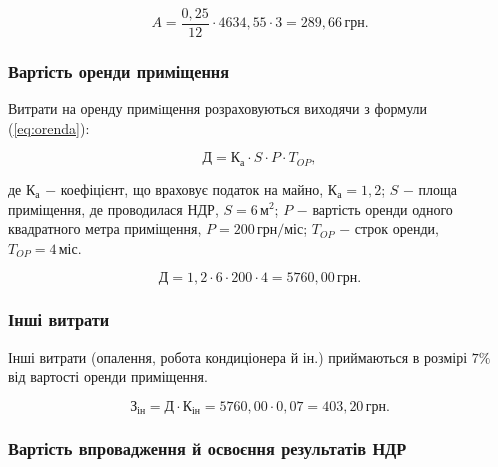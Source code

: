 \[
A = \frac{0,25}{12} \cdot 4634,55 \cdot 3 = 289,66 \, \text{грн}.
\]

\vspace{1.5em}

\subsubsection{Вартість оренди приміщення}

Витрати на оренду примiщення розраховуються виходячи з формули (\ref{eq:orenda}):

\begin{equation}\label{eq:orenda}
\text{Д} = \text{К}_{\text{а}} \cdot S \cdot P \cdot T_{OP},
\end{equation}

\noindent де $\text{К}_{\text{а}}$ $-$ коефіцієнт, що враховує податок на майно, $\text{К}_{\text{а}} = 1,2$;\newline
\hspace*{19pt}$S$ $-$ площа приміщення, де проводилася НДР, $S = 6 \, \text{м}^{2}$;\newline
\hspace*{19pt}$P$ $-$ вартість оренди одного квадратного метра приміщення,\newline
\hspace*{19pt}$P = 200 \, \text{грн}/\text{міс}$;\newline
\hspace*{19pt}$T_{OP}$ $-$ строк оренди, $T_{OP} = 4 \, \text{міс}$.

\[
\text{Д} = 1,2 \cdot 6 \cdot 200 \cdot 4 = 5760,00 \, \text{грн}.
\]

\vspace{1.5em}

\subsubsection{Інші витрати}

Інші витрати (опалення, робота кондиціонера й ін.) приймаються в розмірі $7\%$ від вартості оренди приміщення. 

\[
\text{З}_{\text{ін}} = \text{Д} \cdot \text{К}_{\text{ін}} = 5760,00 \cdot 0,07 = 403,20 \, \text{грн}. 
\]

\vspace{1.5em}

\subsubsection{Вартість впровадження й освоєння результатів НДР}

